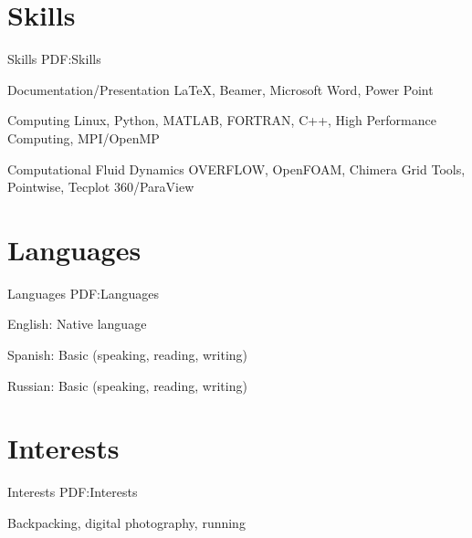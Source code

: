 \documentclass[letterpaper,MMMyyyy,nonstop]{simpleresumecv}
\begin{document}
\begin{body}






\section
{Skills}
{Skills}
{PDF:Skills}

Documentation/Presentation
\BulletItem
{\LaTeX},
Beamer,
Microsoft Word, Power Point

\GapNoBreak
Computing
\BulletItem
Linux,
Python,
MATLAB,
FORTRAN,
C++,
High Performance Computing,
MPI/OpenMP

\GapNoBreak
Computational Fluid Dynamics
\BulletItem
OVERFLOW,
OpenFOAM,
Chimera Grid Tools,
Pointwise,
Tecplot 360/ParaView



\section
{Languages}
{Languages}
{PDF:Languages}

\BulletItem
English: Native language

\GapNoBreak
\BulletItem
Spanish: Basic (speaking, reading, writing)

\GapNoBreak
\BulletItem
Russian: Basic (speaking, reading, writing)


\section
{Interests}
{Interests}
{PDF:Interests}

Backpacking,
digital photography,
running




\end{body}
\end{document}
